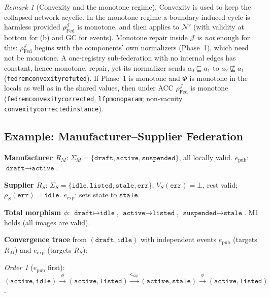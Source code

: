 \documentclass[11pt,a4paper]{article}
\theoremstyle{plain}
\theoremstyle{definition}
\theoremstyle{remark}
\newtheorem{remark}[theorem]{Remark}
\newcommand{\Fed}{\mathrm{Fed}}
\renewcommand{\_}{\textunderscore\allowbreak}
\begin{document}
\begin{remark}[Convexity and the monotone regime]
Convexity is used to keep the collapsed network acyclic.  In the monotone
regime a boundary-induced cycle is harmless provided $\rho_{\Fed}^{\mathcal{J}}$
is monotone, and then  applies to $\mathcal{N}'$
(with validity at bottom for (b) and GC for events).  Monotone repair inside
$\mathcal{J}$ is \emph{not} enough for this: $\rho_{\Fed}^{\mathcal{J}}$ begins
with the components' own normalizers (Phase~1), which need not be monotone.  A
one-registry sub-federation with no internal edges has constant, hence
monotone, repair, yet its normalizer sends $a_0 \sqsubseteq a_1$ to
$a_2 \not\sqsubseteq a_1$ (\texttt{fed\_rem\_convexity\_refuted}).  If Phase~1
is monotone and $\Phi$ is monotone in the locals as well as in the shared
values, then under ACC $\rho_{\Fed}^{\mathcal{J}}$ is monotone
(\texttt{fed\_rem\_convexity\_corrected}, \texttt{lfp\_mono\_param}; non-vacuity
\texttt{convexity\_corrected\_instance}).
\end{remark}

\subsection{Example: Manufacturer--Supplier Federation}

\textbf{Manufacturer $R_M$}: $\Sigma_M = \{\texttt{draft}, \texttt{active},
\texttt{suspended}\}$, all locally valid.
$e_{\mathrm{pub}}$: $\texttt{draft} \to \texttt{active}$.

\textbf{Supplier $R_S$}: $\Sigma_S = \{\texttt{idle}, \texttt{listed},
\texttt{stale}, \texttt{err}\}$; $V_S(\texttt{err}) = \bot$, rest valid;
$\rho_S(\texttt{err}) = \texttt{idle}$.
$e_{\mathrm{exp}}$: sets state to $\texttt{stale}$.

\textbf{Total morphism $\phi$}:
$\texttt{draft} \mapsto \texttt{idle}$,
$\texttt{active} \mapsto \texttt{listed}$,
$\texttt{suspended} \mapsto \texttt{stale}$.
M1 holds (all images are valid).

\textbf{Convergence trace} from $(\texttt{draft}, \texttt{idle})$ with
independent events $e_{\mathrm{pub}}$ (targets $R_M$) and $e_{\mathrm{exp}}$
(targets $R_S$):

\emph{Order 1} ($e_{\mathrm{pub}}$ first):
$(\texttt{active}, \texttt{idle}) \xrightarrow{\phi}
(\texttt{active}, \texttt{listed}) \xrightarrow{e_{\mathrm{exp}}}
(\texttt{active}, \texttt{stale}) \xrightarrow{\phi}
(\texttt{active}, \texttt{listed})$.
\end{document}
